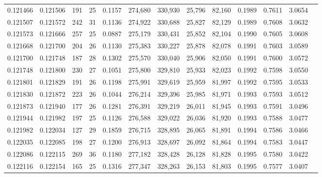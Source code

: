 \begin{tabular}{rrrrrrrrrrrrr}
0.121466 & 0.121506 & 191 &  25 &                                     0.1157 & 274,680 & 330,930 &  25,796 &  82,160 & 0.1989 & 0.7611 & 3.0654 \\
0.121507 & 0.121572 & 242 &  31 &                                     0.1136 & 274,922 & 330,688 &  25,827 &  82,129 & 0.1989 & 0.7608 & 3.0632 \\
0.121573 & 0.121666 & 257 &  25 &                                     0.0887 & 275,179 & 330,431 &  25,852 &  82,104 & 0.1990 & 0.7605 & 3.0608 \\
0.121668 & 0.121700 & 204 &  26 &                                     0.1130 & 275,383 & 330,227 &  25,878 &  82,078 & 0.1991 & 0.7603 & 3.0589 \\
0.121700 & 0.121748 & 187 &  28 &                                     0.1302 & 275,570 & 330,040 &  25,906 &  82,050 & 0.1991 & 0.7600 & 3.0572 \\
0.121748 & 0.121800 & 230 &  27 &                                     0.1051 & 275,800 & 329,810 &  25,933 &  82,023 & 0.1992 & 0.7598 & 3.0550 \\
0.121801 & 0.121829 & 191 &  26 &                                     0.1198 & 275,991 & 329,619 &  25,959 &  81,997 & 0.1992 & 0.7595 & 3.0533 \\
0.121830 & 0.121872 & 223 &  26 &                                     0.1044 & 276,214 & 329,396 &  25,985 &  81,971 & 0.1993 & 0.7593 & 3.0512 \\
0.121873 & 0.121940 & 177 &  26 &                                     0.1281 & 276,391 & 329,219 &  26,011 &  81,945 & 0.1993 & 0.7591 & 3.0496 \\
0.121944 & 0.121982 & 197 &  25 &                                     0.1126 & 276,588 & 329,022 &  26,036 &  81,920 & 0.1993 & 0.7588 & 3.0477 \\
0.121982 & 0.122034 & 127 &  29 &                                     0.1859 & 276,715 & 328,895 &  26,065 &  81,891 & 0.1994 & 0.7586 & 3.0466 \\
0.122035 & 0.122085 & 198 &  27 &                                     0.1200 & 276,913 & 328,697 &  26,092 &  81,864 & 0.1994 & 0.7583 & 3.0447 \\
0.122086 & 0.122115 & 269 &  36 &                                     0.1180 & 277,182 & 328,428 &  26,128 &  81,828 & 0.1995 & 0.7580 & 3.0422 \\
0.122116 & 0.122154 & 165 &  25 &                                     0.1316 & 277,347 & 328,263 &  26,153 &  81,803 & 0.1995 & 0.7577 & 3.0407 \\

\end{tabular}
